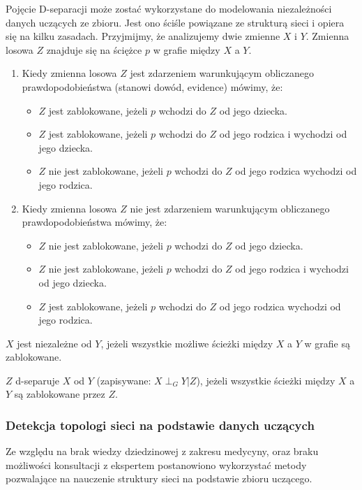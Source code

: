 \documentclass[12pt]{article}
\begin{document}
Pojęcie D-separacji może zostać wykorzystane do modelowania niezależności danych uczących ze zbioru. Jest ono ściśle powiązane ze strukturą sieci i opiera się na kilku zasadach. Przyjmijmy, że analizujemy dwie zmienne $X$ i $Y$. Zmienna losowa $Z$ znajduje się na ściężce $p$ w grafie między $X$ a $Y$.
\begin{enumerate}
\item Kiedy zmienna losowa $Z$ jest zdarzeniem warunkującym obliczanego prawdopodobieństwa (stanowi dowód, evidence) mówimy, że:
\begin{itemize}
 \item $Z$ jest zablokowane, jeżeli $p$ wchodzi do $Z$ od jego dziecka.
 \item $Z$ jest zablokowane, jeżeli $p$ wchodzi do $Z$ od jego rodzica i wychodzi od jego dziecka.
 \item $Z$ nie jest zablokowane, jeżeli $p$ wchodzi do $Z$ od jego rodzica wychodzi od jego rodzica.
\end{itemize}
\item Kiedy zmienna losowa $Z$ nie jest zdarzeniem warunkującym obliczanego prawdopodobieństwa mówimy, że:
\begin{itemize}
 \item $Z$ nie jest zablokowane, jeżeli $p$ wchodzi do $Z$ od jego dziecka.
 \item $Z$ nie jest zablokowane, jeżeli $p$ wchodzi do $Z$ od jego rodzica i wychodzi od jego dziecka.
 \item $Z$ jest zablokowane, jeżeli $p$ wchodzi do $Z$ od jego rodzica wychodzi od jego rodzica.
\end{itemize}
\end{enumerate}

$X$ jest niezależne od $Y$, jeżeli wszystkie możliwe ścieżki między $X$ a $Y$ w grafie są zablokowane.

$Z$ d-separuje $X$ od $Y$ (zapisywane: $X \perp_G Y|Z$), jeżeli wszystkie ścieżki między $X$ a $Y$ są zablokowane przez $Z$.

\subsubsection{Detekcja topologi sieci na podstawie danych uczących}

Ze względu na brak wiedzy dziedzinowej z zakresu medycyny, oraz braku możliwości konsultacji z ekspertem postanowiono wykorzystać metody pozwalające na nauczenie struktury sieci na podstawie zbioru uczącego.
\end{document}
